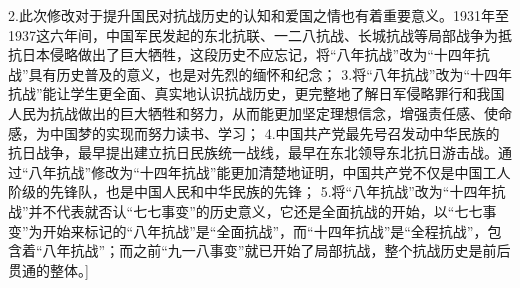 \begin{enumerate}
             2.此次修改对于提升国民对抗战历史的认知和爱国之情也有着重要意义。1931年至1937这六年间，中国军民发起的东北抗联、一二八抗战、长城抗战等局部战争为抵抗日本侵略做出了巨大牺牲，这段历史不应忘记，将“八年抗战”改为“十四年抗战”具有历史普及的意义，也是对先烈的缅怀和纪念；
             3.将“八年抗战”改为“十四年抗战”能让学生更全面、真实地认识抗战历史，更完整地了解日军侵略罪行和我国人民为抗战做出的巨大牺牲和努力，从而能更加坚定理想信念，增强责任感、使命感，为中国梦的实现而努力读书、学习；
             4.中国共产党最先号召发动中华民族的抗日战争，最早提出建立抗日民族统一战线，最早在东北领导东北抗日游击战。通过“八年抗战”修改为“十四年抗战”能更加清楚地证明，中国共产党不仅是中国工人阶级的先锋队，也是中国人民和中华民族的先锋；
             5.将“八年抗战”改为“十四年抗战”并不代表就否认“七七事变”的历史意义，它还是全面抗战的开始，以“七七事变”为开始来标记的“八年抗战”是“全面抗战”，而“十四年抗战”是“全程抗战”，包含着“八年抗战”；而之前“九一八事变”就已开始了局部抗战，整个抗战历史是前后贯通的整体。]
\end{enumerate}

